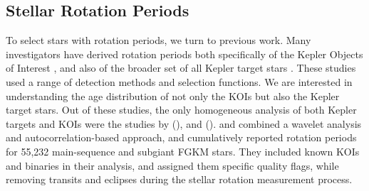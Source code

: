 \documentclass[11pt,twocolumn,tighten]{aastex63}
\begin{document}
\subsection{Stellar Rotation Periods}
\label{subsec:rotsel}

To select stars with rotation periods, we turn to previous work.
Many investigators have derived rotation periods both specifically of
the Kepler Objects of Interest
\citep{McQuillan_2013,Walkowicz_2013,Mazeh_2015,Angus_2018,David_2021},
and also of the broader set of all Kepler target stars
\citep{McQuillan_2014,Reinhold_2015,Santos_2019,Santos_2021}.
These studies used a range of detection methods and selection
functions.
We are interested in understanding the age distribution of not only
the KOIs but also the Kepler target stars.
Out of these studies, the only homogeneous analysis of both Kepler
targets and KOIs were the studies by
\citet{Santos_2019} (),
and \citet{Santos_2021} ().
 and
 combined a wavelet analysis and
autocorrelation-based approach, and cumulatively reported rotation
periods for 55{,}232 main-sequence and subgiant FGKM stars.
They included known KOIs and binaries in their analysis, and assigned
them specific quality flags, while removing transits and eclipses
during the stellar rotation measurement process. 

\end{document}
